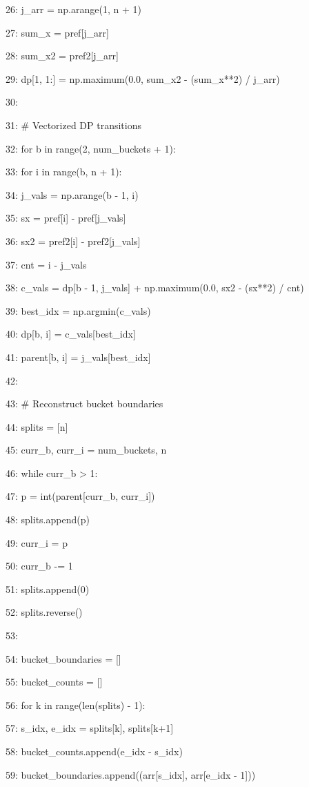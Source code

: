 \documentclass[11pt,a4paper]{article}
\begin{document}
{26:     j\_arr = np.arange(1, n + 1)

27:     sum\_x = pref[j\_arr]

28:     sum\_x2 = pref2[j\_arr]

29:     dp[1, 1:] = np.maximum(0.0, sum\_x2 - (sum\_x**2) / j\_arr)

30:

31:     \# Vectorized DP transitions

32:     for b in range(2, num\_buckets + 1):

33:         for i in range(b, n + 1):

34:             j\_vals = np.arange(b - 1, i)

35:             sx = pref[i] - pref[j\_vals]

36:             sx2 = pref2[i] - pref2[j\_vals]

37:             cnt = i - j\_vals

38:             c\_vals = dp[b - 1, j\_vals] + np.maximum(0.0, sx2 - (sx**2) / cnt)

39:             best\_idx = np.argmin(c\_vals)

40:             dp[b, i] = c\_vals[best\_idx]

41:             parent[b, i] = j\_vals[best\_idx]

42:

43:     \# Reconstruct bucket boundaries

44:     splits = [n]

45:     curr\_b, curr\_i = num\_buckets, n

46:     while curr\_b > 1:

47:         p = int(parent[curr\_b, curr\_i])

48:         splits.append(p)

49:         curr\_i = p

50:         curr\_b -= 1

51:     splits.append(0)

52:     splits.reverse()

53:

54:     bucket\_boundaries = []

55:     bucket\_counts = []

56:     for k in range(len(splits) - 1):

57:         s\_idx, e\_idx = splits[k], splits[k+1]

58:         bucket\_counts.append(e\_idx - s\_idx)

59:         bucket\_boundaries.append((arr[s\_idx], arr[e\_idx - 1]))

}
\end{document}
